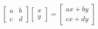 \documentclass{article}
\begin{document}
\thispagestyle{empty}

$$
\begin{bmatrix}a&b\\c&d\end{bmatrix}
\begin{bmatrix}x\\y\end{bmatrix} = \begin{bmatrix}ax+by\\cx+dy\end{bmatrix}
$$
\end{document}
